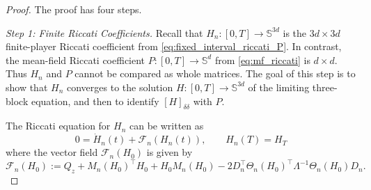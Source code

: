\documentclass[12pt]{article}
\numberwithin{equation}{section}
\theoremstyle{definition}
\begin{document}
\begin{proof}
The proof has four steps.

\emph{Step 1: Finite Riccati Coefficients.}
Recall that \(H_n:[0,T]\to\mathbb S^{3d}\) is the \(3d\times3d\) finite-player
Riccati coefficient from \eqref{eq:fixed_interval_riccati_P}. In contrast, the
mean-field Riccati coefficient \(P:[0,T]\to\mathbb S^d\) from
\eqref{eq:mf_riccati} is \(d\times d\). Thus \(H_n\) and \(P\) cannot be
compared as whole matrices. The goal of this step is to show that \(H_n\)
converges to the solution \(H:[0,T]\to\mathbb S^{3d}\) of the limiting
three-block equation, and then to identify
\([H]_{\delta\delta}\) with \(P\).

The Riccati equation for \(H_n\) can be written as
\begin{equation}\label{eq:finite_riccati_vector_field_ode}
0=\dot H_n(t)+\mathscr F_n(H_n(t)),
\qquad
H_n(T)=H_T
\end{equation}
where the vector field \(\mathscr F_n(H_0)\) is given by
\[
\mathscr F_n(H_0)
:=
Q_z
+M_n(H_0)^\top H_0
+H_0 M_n(H_0)
-2D_n^\top
\Theta_n(H_0)^\top\Lambda^{-1}\Theta_n(H_0)D_n.
\]


\end{proof}
\end{document}
